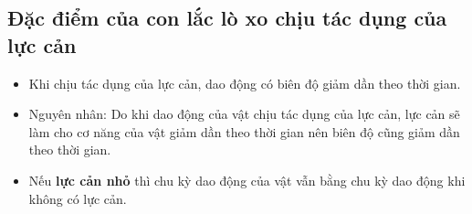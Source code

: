 \subsection{Đặc điểm của con lắc lò xo chịu tác dụng của lực cản}
\begin{itemize}
	\item  Khi chịu tác dụng của lực cản, dao động có biên độ giảm dần theo thời gian.
	\item Nguyên nhân: Do khi dao động của vật chịu tác dụng của lực cản, lực cản sẽ làm cho cơ năng của vật giảm dần theo thời gian nên biên độ cũng giảm dần theo thời gian.
	\item Nếu \textbf{lực cản nhỏ} thì chu kỳ dao động của vật vẫn bằng chu kỳ dao động khi không có lực cản.	
\end{itemize}



